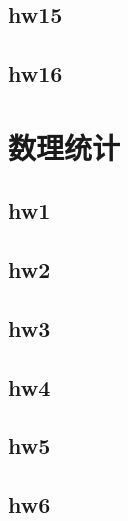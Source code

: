 \documentclass{mynote}
\begin{document}
\section{hw15}

\section{hw16}



\chapter{数理统计}


















\section{hw1}

\section{hw2}

\section{hw3}

\section{hw4}

\section{hw5}

\section{hw6}

\end{document}
